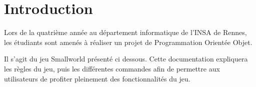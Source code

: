 \section{Introduction}
\label{section:intro}

	Lors de la quatrième année au département informatique de l'INSA de Rennes, les étudiants sont amenés à réaliser un projet de Programmation Orientée Objet.

	Il s'agit du jeu Smallworld présenté ci dessous. Cette documentation expliquera les règles du jeu, puis les différentes commandes afin de permettre aux utilisateurs de profiter pleinement des fonctionnalités du jeu.